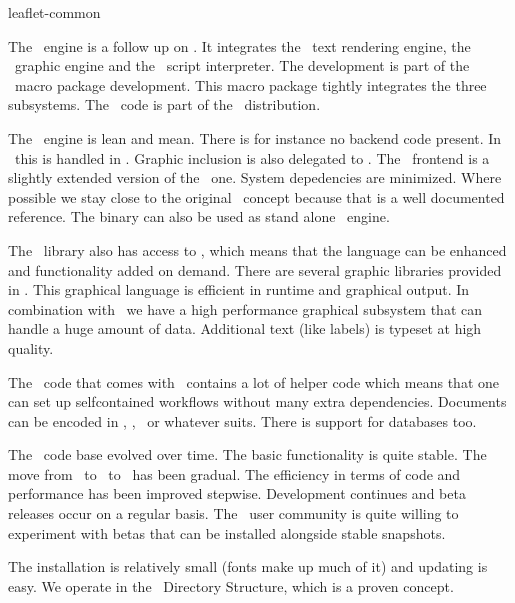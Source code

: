 \environment leaflet-common

\startdocument[graphic=2]

\startbuffer[1]
    The \LUAMETATEX\ engine is a follow up on \LUATEX. It integrates the \TEX\
    text rendering engine, the \METAPOST\ graphic engine and the \LUA\ script
    interpreter. The development is part of the \CONTEXT\ macro package
    development. This macro package tightly integrates the three subsystems. The
    \LUAMETATEX\ code is part of the \CONTEXT\ distribution.
\stopbuffer

\startbuffer[2]
    The \LUAMETATEX\ engine is lean and mean. There is for instance no backend
    code present. In \CONTEXT\ this is handled in \LUA. Graphic inclusion is also
    delegated to \LUA. The \TEX\ frontend is a slightly extended version of the
    \LUATEX\ one. System depedencies are minimized. Where possible we stay close
    to the original \TEX\ concept because that is a well documented reference.
    The binary can also be used as stand alone \LUA\ engine.
\stopbuffer

\startbuffer[3]
    The \METAPOST\ library also has access to \LUA, which means that the language
    can be enhanced and functionality added on demand. There are several graphic
    libraries provided in \CONTEXT. This graphical language is efficient in
    runtime and graphical output. In combination with \LUA\ we have a high
    performance graphical subsystem that can handle a huge amount of data.
    Additional text (like labels) is typeset at high quality.
\stopbuffer

\startbuffer[4]
    The \LUA\ code that comes with \CONTEXT\ contains a lot of helper code which
    means that one can set up selfcontained workflows without many extra
    dependencies. Documents can be encoded in \TEX, \LUA, \XML\ or whatever
    suits. There is support for databases too.
\stopbuffer

\startbuffer[5]
    The \CONTEXT\ code base evolved over time. The basic functionality is quite stable.
    The move from \MKII\ to \MKIV\ to \LMTX\ has been gradual. The efficiency in terms
    of code and performance has been improved stepwise. Development continues and beta
    releases occur on a regular basis. The \CONTEXT\ user community is quite willing
    to experiment with betas that can be installed alongside stable snapshots.

    \blank

    The installation is relatively small (fonts make up much of it) and updating is
    easy. We operate in the \TEX\ Directory Structure, which is a proven concept.
\stopbuffer

